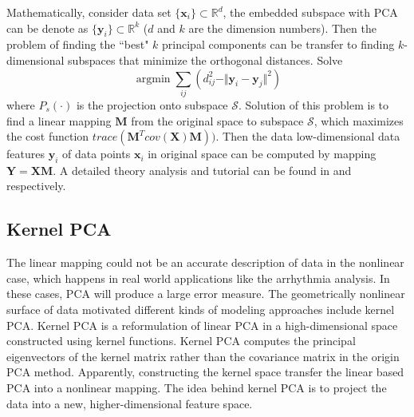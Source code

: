 \documentclass[journal]{IEEEtran}
\DeclareMathOperator*{\argmin}{argmin}
\begin{document}
Mathematically, consider data set $\{\boldsymbol{x}_i\} \subset \mathbb{R}^d$, the embedded subspace with PCA can be denote as $\{\boldsymbol{y}_i\} \subset \mathbb{R}^k$ ($d$ and $k$ are the dimension numbers). 
Then the problem of finding the ``best"  $k$ principal components can be transfer to finding $k$-dimensional subspaces that minimize the orthogonal distances.
Solve 
\begin{equation}
\label{equPCA}
\argmin \sum_{ij} (d_{ij}^2 - \Vert \bm{y}_i - \bm{y}_j \Vert^2)
\end{equation}
where $P_s(\cdot)$ is the projection onto subspace $\mathcal{S}$.
Solution of this problem is to find a linear mapping $\boldsymbol{M}$ from the original space to subspace $\mathcal{S}$, which maximizes the cost function $trace(\boldsymbol{M}^Tcov(\boldsymbol{X})\boldsymbol{M}))$. Then the data low-dimensional data features $\boldsymbol{y}_i$ of data points $\boldsymbol{x}_i$ in original space can be computed by mapping $\boldsymbol{Y} = \boldsymbol{X} \boldsymbol{M}$.
A detailed theory analysis and tutorial can be found in \cite{abdi2010principal} and \cite{shlens2014tutorial} respectively. 


%
%

\subsection{Kernel PCA}
The linear mapping could not be an accurate description of data in the nonlinear case, which happens in real world applications like the arrhythmia analysis.
In these cases, PCA will produce a large error measure. 
The geometrically nonlinear surface of data motivated different kinds of modeling approaches include kernel PCA.
Kernel PCA is a reformulation of linear PCA in a high-dimensional space constructed using kernel functions.
Kernel PCA computes the principal eigenvectors of the kernel matrix rather than the covariance matrix in the origin PCA method.
Apparently, constructing the kernel space transfer the linear based PCA into a nonlinear mapping.
The idea behind kernel PCA is to project the data into a new, higher-dimensional feature space.
\end{document}
